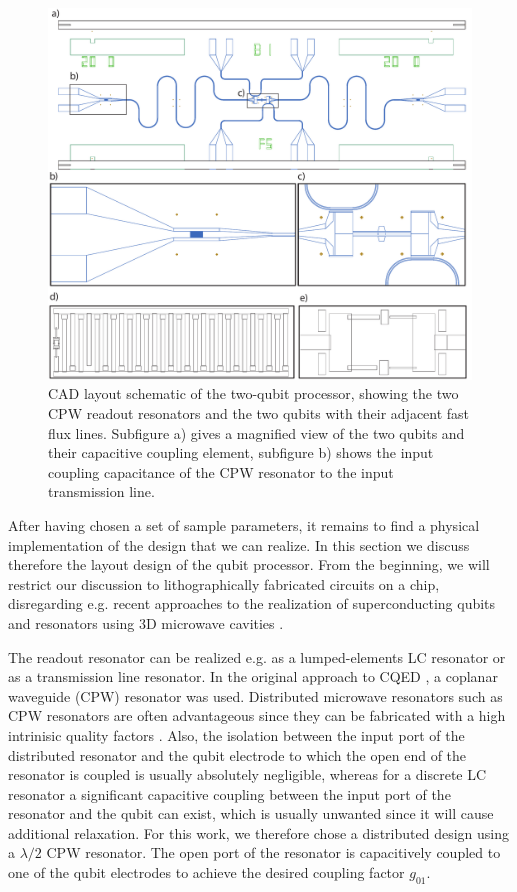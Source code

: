 \begin{figure}[ht!]
	\centering
	\includegraphics[width=\textwidth]{./material/figures/2-qubit-processor/fabrication/qubit_processor_layout}
	\caption[]{CAD layout schematic of the two-qubit processor, showing the two CPW readout resonators and the two qubits with their adjacent fast flux lines. Subfigure a) gives a magnified view of the two qubits and their capacitive coupling element, subfigure b) shows the input coupling capacitance of the CPW resonator to the input transmission line.}
	\label{fig:processor_fabrication}
\end{figure}

After having chosen a set of sample parameters, it remains to find a physical implementation of the design that we can realize. In this section we discuss therefore the layout design of the qubit processor. From the beginning, we will restrict our discussion to lithographically fabricated circuits on a chip, disregarding e.g. recent approaches to the realization of superconducting qubits and resonators using 3D microwave cavities \citep{paik_observation_2011}.

\smallskip

The readout resonator can be realized e.g. as a lumped-elements LC resonator or as a transmission line resonator. In the original approach to CQED \citep{wallraff_strong_2004}, a coplanar waveguide (CPW) resonator was used. Distributed microwave resonators such as CPW resonators are often advantageous since they can be fabricated with a high intrinisic quality factors \citep{}. Also, the isolation between the input port of the distributed resonator and the qubit electrode to which the open end of the resonator is coupled is usually absolutely negligible, whereas for a discrete LC resonator a significant capacitive coupling between the input port of the resonator and the qubit can exist, which is usually unwanted since it will cause additional relaxation. For this work, we therefore chose a distributed design using a $\lambda/2$ CPW resonator. The open port of the resonator is capacitively coupled to one of the qubit electrodes to achieve the desired coupling factor $g_{01}$.

